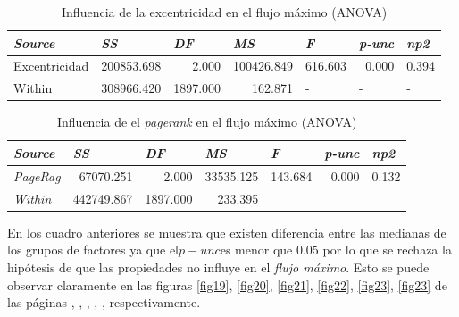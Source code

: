\documentclass{article}
\begin{document}
\begin{table}[htbp]
  \centering
  \caption{Influencia de la excentricidad en el flujo máximo (ANOVA)}
    \begin{tabular}{lrrrlll}
    \toprule
    \textit{\textbf{Source}} & \multicolumn{1}{l}{\textit{\textbf{SS}}} & \multicolumn{1}{l}{\textit{\textbf{DF}}} & \multicolumn{1}{l}{\textit{\textbf{MS}}} & \textit{\textbf{F}} & \textit{\textbf{p-unc}} & \textit{\textbf{np2}} \\
    \midrule
    Excentricidad & 200853.698 & 2.000 & 100426.849 & \multicolumn{1}{r}{616.603} & \multicolumn{1}{r}{0.000} & \multicolumn{1}{r}{0.394} \\
    Within & 308966.420 & 1897.000 & 162.871 & -     & -     & - \\
    \bottomrule
    \end{tabular}%
  \label{tab:t25}%
\end{table}%

\begin{table}[htbp]
  \centering
  \caption{Influencia de el \textit{pagerank} en el flujo máximo (ANOVA)}
    \begin{tabular}{lrrrrrr}
    \toprule
    \textit{\textbf{Source}} & \multicolumn{1}{l}{\textit{\textbf{SS}}} & \multicolumn{1}{l}{\textit{\textbf{DF}}} & \multicolumn{1}{l}{\textit{\textbf{MS}}} & \multicolumn{1}{l}{\textit{\textbf{F}}} & \multicolumn{1}{l}{\textit{\textbf{p-unc}}} & \multicolumn{1}{l}{\textit{\textbf{np2}}} \\
    \midrule
    \textit{PageRag} & 67070.251 & 2.000 & 33535.125 & 143.684 & 0.000 & 0.132 \\
    \textit{Within} & 442749.867 & 1897.000 & 233.395 &       &       &  \\
    \bottomrule
    \end{tabular}%
  \label{tab:t26}%
\end{table}%

En los cuadro anteriores se muestra que existen diferencia entre las medianas de los grupos de factores ya que el\textbf{$p-unc$}es menor que $0.05$ por lo que se rechaza la hipótesis de que las propiedades no influye en el \textit{flujo máximo}. Esto se puede observar claramente en las figuras \ref{fig19}, \ref{fig20}, \ref{fig21}, \ref{fig22}, \ref{fig23}, \ref{fig23} de las páginas \pageref{fig19}, \pageref{fig20}, \pageref{fig21}, \pageref{fig22}, \pageref{fig23}, \pageref{fig24} respectivamente.
\end{document}
